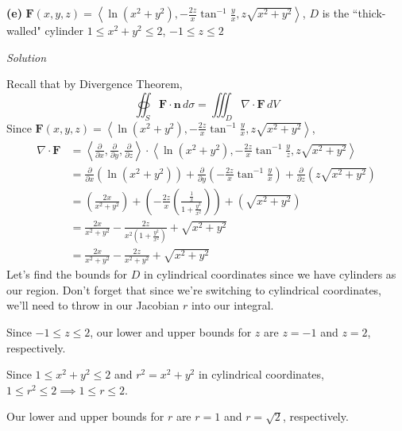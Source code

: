 \documentclass{article}
\newcommand{\lrp}[1]{\left( #1 \right)}
\newcommand{\lra}[1]{\left\langle #1 \right\rangle}
\newcommand{\F}[0]{\mathbf{F}}
\newcommand{\n}[0]{{\mathbf{n}}}
\newcommand{\Solution}{\textit{Solution}}
\begin{document}
{}\textbf{(e)} $\displaystyle\F(x,y,z)=\lra{\ln (x^2+y^2), -\frac{2z}{x}\tan^{-1}\frac{y}{x},z\sqrt{x^2+y^2}}$, $D$ is the ``thick-walled" cylinder $1\leq x^2+y^2\leq 2$, $-1 \leq z \leq 2$

\Solution

Recall that by Divergence Theorem,
\begin{equation*}
    \oiint_S \F\cdot \n \,d\sigma = \iiint_D \nabla \cdot \F\,dV
\end{equation*}
Since $\F(x,y,z)=\lra{\ln (x^2+y^2), -\frac{2z}{x}\tan^{-1}\frac{y}{x},z\sqrt{x^2+y^2}}$,
\begin{align*}
    \nabla \cdot \F&=\lra{\frac{\partial }{\partial x},\frac{\partial }{\partial y},\frac{\partial }{\partial z}}\cdot \lra{\ln (x^2+y^2), -\frac{2z}{x}\tan^{-1}\frac{y}{z},z\sqrt{x^2+y^2}}\\
    &=\frac{\partial}{\partial x}\lrp{\ln (x^2+y^2)}+\frac{\partial}{\partial y}\lrp{-\frac{2z}{x}\tan^{-1}\frac{y}{x}}+\frac{\partial}{\partial z}\lrp{z\sqrt{x^2+y^2}}\\
    &= \lrp{\frac{2x}{x^2+y^2}}+\lrp{-\frac{2z}{x}\lrp{\frac{\frac{1}{x}}{1+\frac{y^2}{x^2}}}}+\lrp{\sqrt{x^2+y^2}}\\
    &=\frac{2x}{x^2+y^2}-\frac{2z}{x^2\lrp{1+\frac{y^2}{x^2}}}+\sqrt{x^2+y^2}\\
    &=\frac{2x}{x^2+y^2}-\frac{2z}{x^2+y^2}+\sqrt{x^2+y^2}
\end{align*}
Let's find the bounds for $D$ in cylindrical coordinates since we have cylinders as our region. Don't forget that since we're switching to cylindrical coordinates, we'll need to throw in our Jacobian $r$ into our integral.


Since $-1 \leq z \leq 2$, our lower and upper bounds for $z$ are $z=-1$ and $z=2$, respectively.

Since $1\leq x^2+y^2\leq 2$ and $r^2=x^2+y^2$ in cylindrical coordinates, $1\leq r^2 \leq 2\implies 1\leq r\leq 2$.

Our lower and upper bounds for $r$ are $r=1$ and $r=\sqrt{2}$, respectively.
\end{document}
